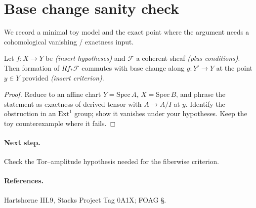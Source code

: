 \section{Base change sanity check}\label{sec:base-change}
We record a minimal toy model and the exact point where the argument needs a
cohomological vanishing / exactness input.

\begin{lemma}\label{lem:base-change}
Let $f:X\to Y$ be \emph{(insert hypotheses)} and $\mathcal F$ a coherent sheaf
\emph{(plus conditions)}. Then formation of $Rf_\ast \mathcal F$ commutes with base change along $g:Y'\to Y$ at the point $y\in Y$ provided \emph{(insert criterion)}.
\end{lemma}

\begin{proof}
Reduce to an affine chart $Y=\mathrm{Spec}\,A$, $X=\mathrm{Spec}\,B$, and
phrase the statement as exactness of derived tensor with $A\to A/I$ at $y$.
Identify the obstruction in an $\mathrm{Ext}^1$ group; show it vanishes under
your hypotheses. Keep the toy counterexample where it fails.
\end{proof}

\paragraph{Next step.}
Check the Tor–amplitude hypothesis needed for the fiberwise criterion.

\paragraph{References.}
Hartshorne III.9, Stacks Project Tag 0A1X; FOAG §.
